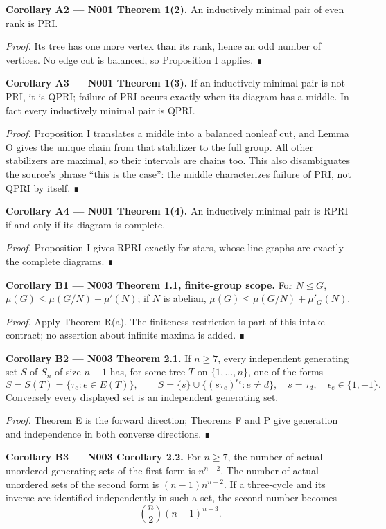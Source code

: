 \documentclass[
  10pt,
  letterpaper,
]{article}
\begin{document}
\textbf{Corollary A2 --- N001 Theorem 1(2).} An inductively minimal pair
of even rank is PRI.

\emph{Proof.} Its tree has one more vertex than its rank, hence an odd
number of vertices. No edge cut is balanced, so Proposition I applies. ∎

\textbf{Corollary A3 --- N001 Theorem 1(3).} If an inductively minimal
pair is not PRI, it is QPRI; failure of PRI occurs exactly when its
diagram has a middle. In fact every inductively minimal pair is QPRI.

\emph{Proof.} Proposition I translates a middle into a balanced nonleaf
cut, and Lemma O gives the unique chain from that stabilizer to the full
group. All other stabilizers are maximal, so their intervals are chains
too. This also disambiguates the source's phrase ``this is the case'':
the middle characterizes failure of PRI, not QPRI by itself. ∎

\textbf{Corollary A4 --- N001 Theorem 1(4).} An inductively minimal pair
is RPRI if and only if its diagram is complete.

\emph{Proof.} Proposition I gives RPRI exactly for stars, whose line
graphs are exactly the complete diagrams. ∎

\textbf{Corollary B1 --- N003 Theorem 1.1, finite-group scope.} For
\(N\unlhd G\), \(\mu(G)\leq\mu(G/N)+\mu'(N)\); if \(N\) is abelian,
\(\mu(G)\leq\mu(G/N)+\mu'_G(N)\).

\emph{Proof.} Apply Theorem R(a). The finiteness restriction is part of
this intake contract; no assertion about infinite maxima is added. ∎

\textbf{Corollary B2 --- N003 Theorem 2.1.} If \(n\geq7\), every
independent generating set \(S\) of \(S_n\) of size \(n-1\) has, for
some tree \(T\) on \(\{1,\ldots,n\}\), one of the forms \[
S=S(T)=\{\tau_e:e\in E(T)\},\qquad
S=\{s\}\cup\{(s\tau_e)^{\epsilon_e}:e\ne d\},
\quad s=\tau_d,\quad\epsilon_e\in\{1,-1\}.
\] Conversely every displayed set is an independent generating set.

\emph{Proof.} Theorem E is the forward direction; Theorems F and P give
generation and independence in both converse directions. ∎

\textbf{Corollary B3 --- N003 Corollary 2.2.} For \(n\geq7\), the number
of actual unordered generating sets of the first form is \(n^{n-2}\).
The number of actual unordered sets of the second form is
\((n-1)n^{n-2}\). If a three-cycle and its inverse are identified
independently in such a set, the second number becomes \[
\binom n2(n-1)^{n-3}.
\]
\end{document}
